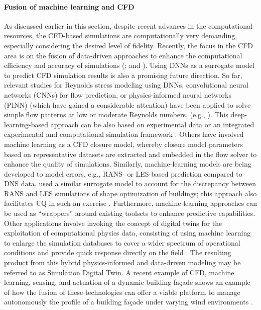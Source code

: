 \paragraph{Fusion of machine learning and CFD} As discussed earlier in this section, despite recent advances in the computational resources, the CFD-based simulations are computationally very demanding, especially considering the desired level of fidelity. Recently, the focus in the CFD area is on the fusion of data-driven approaches to enhance the computational efficiency and accuracy of simulations (\cite{kutz2017deep, ling2016reynolds}; and \cite{kareem2020emerging}). Using DNNs as a surrogate model to predict CFD simulation results is also a promising future direction. So far, relevant studies for Reynolds stress modeling using DNNs, convolutional neural networks (CNNs) for flow prediction, or physics-informed neural networks (PINN) (which have gained a considerable attention) have been applied to solve simple flow patterns at low or moderate Reynolds numbers. (e.g., \cite{tompson2016accelerating, liu2020iterative, mao2020physics}). This deep-learning-based approach can be also based on experimental data or an integrated experimental and computational simulation framework \citep{luo2019deep, luo2020bayesian}. Others have involved machine learning as a CFD closure model, whereby  closure model parameters based on representative datasets are extracted and embedded in the flow solver to enhance the quality of simulations. Similarly, machine-learning models are being developed to model errors, e.g., RANS- or LES-based prediction compared to DNS data. \citep{ding2018multifidelity} used a similar surrogate model to account for the discrepancy between RANS and LES simulations of shape optimization of buildings; this approach also facilitates UQ in such an exercise \citep{ding2018multifidelity, ding2019inflow}. Furthermore, machine-learning approaches can be used as ``wrappers'' around existing toolsets to enhance predictive capabilities. Other applications involve invoking the concept of digital twins for the exploitation of computational physics data, consisting of using machine learning to enlarge the simulation databases to cover a wider spectrum of operational conditions and provide quick response directly on the field \citep{kareem2020emerging, molinaro2021embedding}. The resulting product from this hybrid physics-informed and data-driven modeling may be referred to as Simulation Digital Twin. A recent example of CFD, machine learning, sensing, and actuation of a dynamic building façade shows an example of how the fusion of these technologies can offer a viable platform to manage autonomously the profile of a building façade under varying wind environments \citep{ding2020tall}. 
